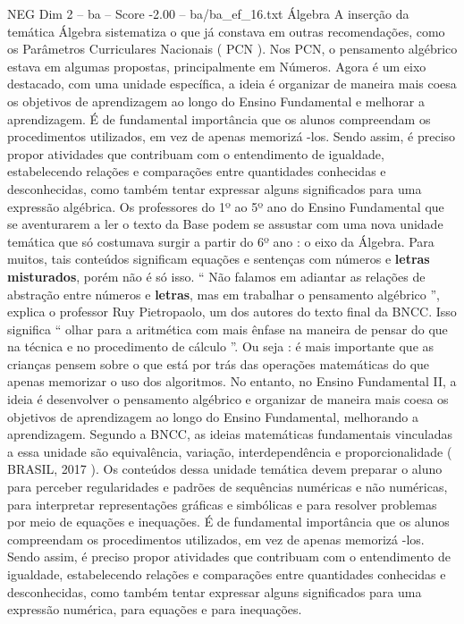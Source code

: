 \begin{textsample}{NEG Dim 2 – ba – Score -2.00 – ba/ba\_ef\_16.txt}
Álgebra A inserção da temática Álgebra sistematiza o que já constava em outras recomendações, como os Parâmetros Curriculares Nacionais ( PCN ).
Nos PCN, o pensamento algébrico estava em algumas propostas, principalmente em Números.
Agora é um eixo destacado, com uma unidade específica, a ideia é organizar de maneira mais coesa os objetivos de aprendizagem ao longo do Ensino Fundamental e melhorar a aprendizagem.
É de fundamental importância que os alunos compreendam os procedimentos utilizados, em vez de apenas memorizá -los.
Sendo assim, é preciso propor atividades que contribuam com o entendimento de igualdade, estabelecendo relações e comparações entre quantidades conhecidas e desconhecidas, como também tentar expressar alguns significados para uma expressão algébrica.
Os professores do 1º ao 5º ano do Ensino Fundamental que se aventurarem a ler o texto da Base podem se assustar com uma nova unidade temática que só costumava surgir a partir do 6º ano : o eixo da Álgebra.
Para muitos, tais conteúdos significam equações e sentenças com números e \textbf{letras} \textbf{misturados}, porém não é só isso. “ Não falamos em adiantar as relações de abstração entre números e \textbf{letras}, mas em trabalhar o pensamento algébrico ”, explica o professor Ruy Pietropaolo, um dos autores do texto final da BNCC.
Isso significa “ olhar para a aritmética com mais ênfase na maneira de pensar do que na técnica e no procedimento de cálculo ”.
Ou seja : é mais importante que as crianças pensem sobre o que está por trás das operações matemáticas do que apenas memorizar o uso dos algoritmos.
No entanto, no Ensino Fundamental II, a ideia é desenvolver o pensamento algébrico e organizar de maneira mais coesa os objetivos de aprendizagem ao longo do Ensino Fundamental, melhorando a aprendizagem.
Segundo a BNCC, as ideias matemáticas fundamentais vinculadas a essa unidade são equivalência, variação, interdependência e proporcionalidade ( BRASIL, 2017 ).
Os conteúdos dessa unidade temática devem preparar o aluno para perceber regularidades e padrões de sequências numéricas e não numéricas, para interpretar representações gráficas e simbólicas e para resolver problemas por meio de equações e inequações.
É de fundamental importância que os alunos compreendam os procedimentos utilizados, em vez de apenas memorizá -los.
Sendo assim, é preciso propor atividades que contribuam com o entendimento de igualdade, estabelecendo relações e comparações entre quantidades conhecidas e desconhecidas, como também tentar expressar alguns significados para uma expressão numérica, para equações e para inequações.

\end{textsample}
